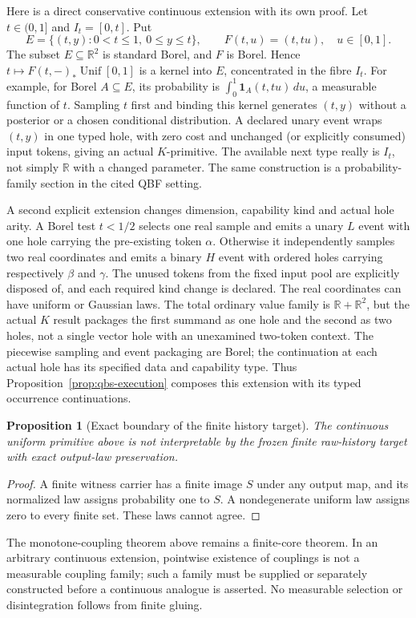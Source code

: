 \documentclass[11pt,a4paper]{article}
\newtheorem{proposition}[theorem]{Proposition}
\theoremstyle{definition}
\begin{document}
Here is a direct conservative continuous extension with its own proof.
Let $t\in(0,1]$ and $I_t=[0,t]$. Put
\[
 E=\{(t,y):0<t\le1,\ 0\le y\le t\},\qquad
 F(t,u)=(t,tu),\quad u\in[0,1].
\]
The subset $E\subseteq\mathbb R^2$ is standard Borel, and $F$ is Borel.
Hence $t\mapsto F(t,-)_*\operatorname{Unif}[0,1]$ is a kernel into $E$,
concentrated in the fibre $I_t$. For example, for Borel $A\subseteq E$,
its probability is $\int_0^1\mathbf1_A(t,tu)\,du$, a measurable function
of $t$. Sampling $t$ first and binding this kernel generates $(t,y)$
without a posterior or a chosen conditional distribution. A declared
unary event wraps $(t,y)$ in one typed hole, with zero cost and unchanged
(or explicitly consumed) input tokens, giving an actual $K$-primitive.
The available next type really is $I_t$, not simply $\mathbb R$ with a
changed parameter. The same construction is a probability-family section
in the cited QBF setting.

A second explicit extension changes dimension, capability kind and actual
hole arity. A Borel test $t<1/2$ selects one real sample and emits a unary
$L$ event with one hole carrying the pre-existing token $\alpha$.
Otherwise it independently samples two real coordinates and emits a binary
$H$ event with ordered holes carrying respectively $\beta$ and $\gamma$.
The unused tokens from the fixed input pool are explicitly disposed of,
and each required kind change is declared. The real coordinates can have
uniform or Gaussian laws. The total ordinary value family is
$\mathbb R+\mathbb R^2$, but the actual $K$ result packages the first
summand as one hole and the second as two holes, not a single vector hole
with an unexamined two-token context. The piecewise sampling and event
packaging are Borel; the continuation at each actual hole has its specified
data and capability type. Thus Proposition~\ref{prop:qbs-execution}
composes this extension with its typed occurrence continuations.

\begin{proposition}[Exact boundary of the finite history target]
\label{prop:atomless}
The continuous uniform primitive above is not interpretable by the frozen
finite raw-history target with exact output-law preservation.
\end{proposition}
\begin{proof}
A finite witness carrier has a finite image $S$ under any output map, and
its normalized law assigns probability one to $S$. A nondegenerate uniform
law assigns zero to every finite set. These laws cannot agree.
\end{proof}
The monotone-coupling theorem above remains a finite-core theorem. In an
arbitrary continuous extension, pointwise existence of couplings is not
a measurable coupling family; such a family must be supplied or separately
constructed before a continuous analogue is asserted. No measurable
selection or disintegration follows from finite gluing.
\end{document}
